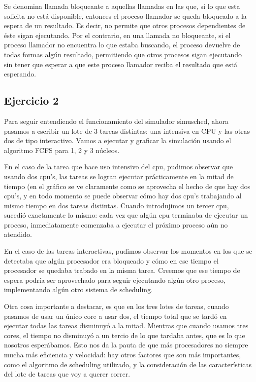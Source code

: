 \documentclass[11pt, a4paper, twoside]{article}
\begin{document}
Se denomina llamada bloqueante a aquellas llamadas en las que, si lo que esta  
solicita no está disponible, entonces el proceso llamador se queda bloqueado a la espera de un
resultado. Es decir, no permite que otros procesos dependientes de éste sigan ejecutando. Por 
el contrario, en una llamada no bloqueante, si el proceso llamador no encuentra lo que estaba
buscando, el proceso devuelve de todas formas algún resultado, permitiendo que otros procesos
sigan ejecutando sin tener que esperar a que este proceso llamador reciba el resultado que está
esperando. 

\clearpage
\subsection{Ejercicio 2}
Para seguir entendiendo el funcionamiento del simulador simusched, ahora pasamos a escribir un lote
de 3 tareas distintas: una intensiva en CPU y las otras dos de tipo interactivo. Vamos a ejecutar y
graficar la simulación usando el algoritmo FCFS para 1, 2 y 3 núcleos. 

En el caso de la tarea que hace uso intensivo del cpu, pudimos observar que usando dos cpu's, las
tareas se logran ejecutar prácticamente en la mitad de tiempo (en el gráfico se ve claramente como
se aprovecha el hecho de que hay dos cpu's, y en todo momento se puede observar cómo hay dos cpu's 
trabajando al mismo tiempo en dos tareas distintas. Cuando introdujimos un tercer cpu, sucedió 
exactamente lo mismo: cada vez que algún cpu terminaba de ejecutar un proceso, inmediatamente
comenzaba a ejecutar el próximo proceso aún no atendido. 

En el caso de las tareas interactivas, pudimos observar los momentos en los que se detectaba que 
algún procesador era bloqueado y cómo en ese tiempo el procesador se quedaba trabado en la misma 
tarea. Creemos que ese tiempo de espera podría ser aprovechado para seguir ejecutando algún otro
proceso, implementando algún otro sistema de scheduling. 

Otra cosa importante a destacar, es que en los tres lotes de tareas, cuando pasamos de usar un único
core a usar dos, el tiempo total que se tardó en ejecutar todas las tareas disminuyó a la mitad.
Mientras que cuando usamos tres cores, el tiempo no disminuyó a un tercio de lo que tardaba antes,
que es lo que nosotros esperábamos. Esto nos da la pauta de que más procesadores no siempre
mucha más eficiencia y velocidad: hay otros factores que son más importantes, como el algoritmo de
scheduling utilizado, y la consideración de las características del lote de tareas que voy a querer
correr. 
\end{document}

